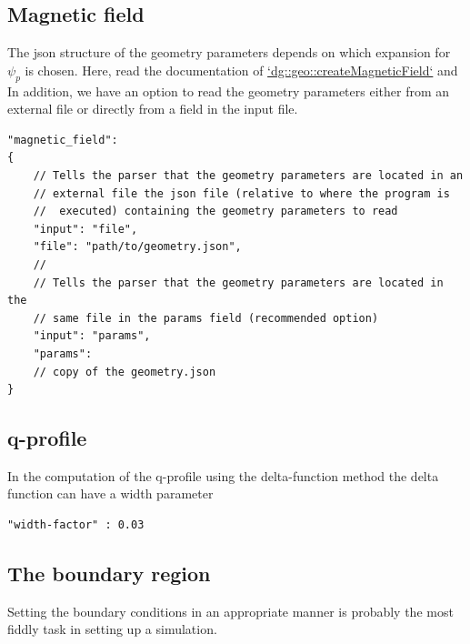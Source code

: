 \subsection{Magnetic field} \label{sec:geometry_file}
The json structure of the geometry parameters depends on which expansion for
$\psi_p$ is chosen. Here, read the documentation of
\href{https://feltor-dev.github.io/feltor/geometries/html/group__geom.html#ga936269e34ec47da9bc44346ab9e1888b}{`dg::geo::createMagneticField`} and \cite{Cerfon2010}
In addition, we have an option to read the geometry parameters either from an external
file or directly from a field in the input file.
\begin{verbatim}
"magnetic_field":
{
    // Tells the parser that the geometry parameters are located in an
    // external file the json file (relative to where the program is
    //  executed) containing the geometry parameters to read
    "input": "file",
    "file": "path/to/geometry.json",
    //
    // Tells the parser that the geometry parameters are located in the
    // same file in the params field (recommended option)
    "input": "params",
    "params":
    // copy of the geometry.json
}
\end{verbatim}
\noindent
\subsection{q-profile}

In the computation of the q-profile using the delta-function method the delta function can have
a width parameter
\begin{verbatim}
"width-factor" : 0.03
\end{verbatim}

\subsection{The boundary region} \label{sec:boundary}
Setting the boundary conditions in an appropriate manner is probably the most
fiddly task in setting up a simulation.
